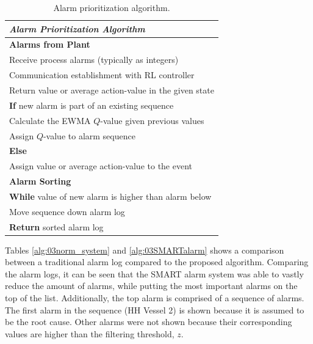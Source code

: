 \begin{table}[H]
    {
    \centering
	\begin{tabular}{p{13cm}}
	\hline
	\emph{Alarm Prioritization Algorithm} \\
	\hline
	\textbf{Alarms from Plant} \\
	\hspace{0.5cm} Receive process alarms (typically as integers) \\
	\hspace{0.5cm} Communication establishment with RL controller \\
	\hspace{1cm} Return value or average action-value in the given state \\
	\hspace{1cm} \textbf{If} new alarm is part of an existing sequence \\
	\hspace{1.5cm} Calculate the EWMA $Q$-value given previous values \\
	\hspace{1.5cm} Assign $Q$-value to alarm sequence \\
	\hspace{1cm} \textbf{Else} \\
	\hspace{1.5cm} Assign value or average action-value to the event \\
	\textbf{Alarm Sorting} \\
	\hspace{0.5cm}\textbf{While} value of new alarm is higher than alarm below \\
	\hspace{1cm} Move sequence down alarm log \\
	\hspace{0.5cm} \textbf{Return} sorted alarm log \\
	\hline
	\end{tabular}}
	\caption{Alarm prioritization algorithm.}
	\label{alg:03alarmprioritization}
\end{table}

Tables \ref{alg:03norm_system} and \ref{alg:03SMARTalarm} shows a comparison between a traditional alarm log compared to the proposed algorithm.  Comparing the alarm logs, it can be seen that the SMART alarm system was able to vastly reduce the amount of alarms, while putting the most important alarms on the top of the list. Additionally, the top alarm is comprised of a sequence of alarms.  The first alarm in the sequence (HH Vessel 2) is shown because it is assumed to be the root cause. Other alarms were not shown because their corresponding values are higher than the filtering threshold, $z$.  

